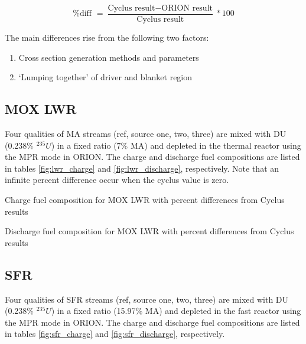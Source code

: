 \documentclass{article}
\begin{document}
\[ \text{\% diff } = \frac{\text{Cyclus result} - \text{ORION result}}{\text{Cyclus result}} * 100 \]

The main differences rise from the following two factors:

\begin{enumerate}
    \item Cross section generation methods and parameters
    \item `Lumping together' of driver and blanket region
\end{enumerate}

\subsection{\gls{MOX} \gls{LWR}}
Four qualities of \gls{MA} streams (ref, source one, two, three) are mixed with 
\gls{DU} (0.238\% $^{235}U$) in a fixed ratio (7\% \gls{MA}) and depleted in the thermal reactor
using the MPR mode in ORION. The charge and discharge fuel compositions are listed in
tables \ref{fig:lwr_charge} and \ref{fig:lwr_discharge}, respectively.  Note that an infinite percent difference
occur when the cyclus value is zero.

\begin{table}[h]
    \centering
    \resizebox{\textwidth}{!}{
    }
    \caption{Charge fuel composition for \gls{MOX} \gls{LWR} with percent differences from
             Cyclus results}
    \label{fig:lwr_charge}
\end{table}

\begin{table}[h]
    \centering
    \resizebox{\textwidth}{!}{
    }
    \caption{Discharge fuel composition for \gls{MOX} \gls{LWR} with percent differences from
             Cyclus results}
    \label{fig:lwr_discharge}
\end{table}

\FloatBarrier

\subsection{\gls{SFR}}
Four qualities of \gls{SFR} streams (ref, source one, two, three) are mixed with
\gls{DU} (0.238\% $^{235}U$) in a fixed ratio (15.97\% \gls{MA}) and depleted in the 
fast reactor using the MPR mode in ORION. The charge and discharge fuel compositions are 
listed in tables \ref{fig:sfr_charge} and \ref{fig:sfr_discharge}, respectively.
\end{document}
